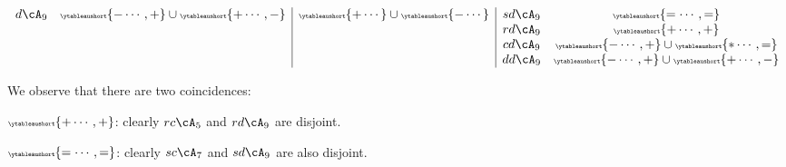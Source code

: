 \documentclass[12pt,a4paper]{amsart}
\numberwithin{equation}{section}
\theoremstyle{remark}
\let\ytb=\ytableaushort
\newcommand{\tytb}[1]{{\tiny\ytb{#1}}}
\begin{document}
\begin{equation}
\begin{array}{cc|c|cc}
  d\cA_{9}              & \tytb{-\cdots,+}\cup \tytb{+\cdots,-}  &
                                        \tytb{+\cdots} \cup\tytb{-\cdots}    & sd\cA_{9} & \tytb{=\cdots,=}                 \\
                        &                    &                & rd\cA_{9} &\tytb{+\cdots,+}                                   \\
                        &                    &                & cd\cA_{9} &\tytb{-\cdots,+}  \cup \tytb{\ast\cdots,=}                \\
                        &                    &                & dd\cA_{9} &\tytb{-\cdots,+} \cup \tytb{+\cdots,-}                       \\
\end{array}
\end{equation}

We observe that there are two coincidences:
\begin{enumT}
  \item $\tytb{+\cdots,+}$: clearly $rc\cA_{5}$ and $rd\cA_{9}$ are disjoint.
  \item $\tytb{=\cdots,=}$: clearly $sc\cA_{7}$ and $sd\cA_{9}$ are also disjoint.
\end{enumT}
\end{document}
